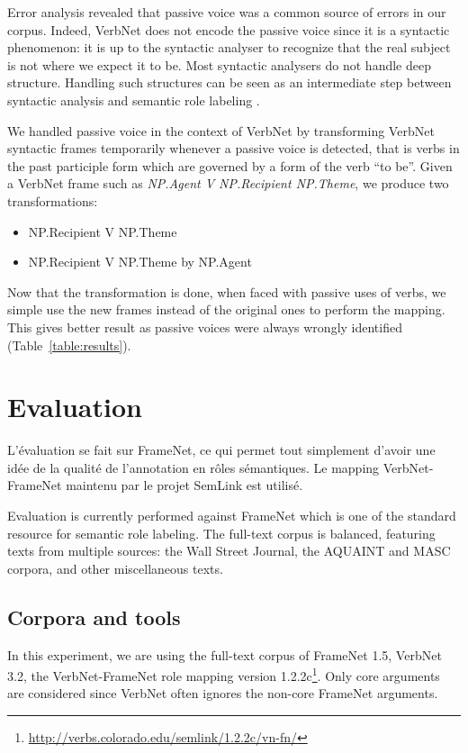 Error analysis revealed that passive voice was a common source of errors in our
corpus. Indeed, VerbNet does not encode the passive voice since it is a
syntactic phenomenon: it is up to the syntactic analyser to recognize that the
real subject is not where we expect it to be. Most syntactic analysers do not
handle deep structure. Handling such structures can be seen as an intermediate
step between syntactic analysis and semantic role labeling
\citep{bonfante2011modular,ribeyre2013systeme}.

We handled passive voice in the context of VerbNet by transforming VerbNet
syntactic frames temporarily whenever a passive voice is detected, that is
verbs in the past participle form which are governed by a form of the verb ``to
be''. Given a VerbNet frame such as \textit{NP.Agent V NP.Recipient NP.Theme},
we produce two transformations:

\begin{itemize}
    \item NP.Recipient V NP.Theme
    \item NP.Recipient V NP.Theme by NP.Agent
\end{itemize}

Now that the transformation is done, when faced with passive uses of verbs, we
simple use the new frames instead of the original ones to perform the mapping.
This gives better result as passive voices were always wrongly identified
(Table~\ref{table:results}).

\section{Evaluation}
\label{srl:evaluation}

L'évaluation se fait sur FrameNet, ce qui permet tout simplement d'avoir une
idée de la qualité de l'annotation en rôles sémantiques. Le mapping
VerbNet-FrameNet maintenu par le projet SemLink est utilisé.

Evaluation is currently performed against FrameNet which is one of the standard
resource for semantic role labeling. The full-text corpus is balanced,
featuring texts from multiple sources: the Wall Street Journal, the AQUAINT and
MASC corpora, and other miscellaneous texts.

\subsection{Corpora and tools}

In this experiment, we are using the full-text corpus of FrameNet 1.5, VerbNet
3.2, the VerbNet-FrameNet role mapping version
1.2.2c\footnote{\url{http://verbs.colorado.edu/semlink/1.2.2c/vn-fn/}}. Only
core arguments are considered since VerbNet often ignores the non-core FrameNet
arguments.

